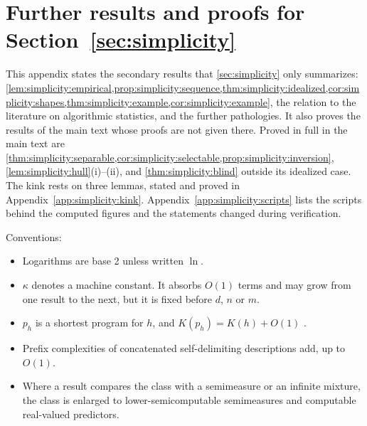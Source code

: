 \providecommand{\Risk}{\mathcal R}
\providecommand{\hRisk}{\hat{\mathcal R}}
\providecommand{\hullm}{\mathrm{hull}^{-}}
\providecommand{\Admiss}{\mathfrak A}
\providecommand{\val}{\mathrm{val}}
\providecommand{\Ax}{\mathrm{Ax}}
\providecommand{\KL}{\mathrm{KL}}
\providecommand{\Unif}{\mathrm{Unif}}
\providecommand{\conv}{\mathrm{conv}}
\providecommand{\Muniv}{\mathbf M}
\providecommand{\muniv}{\mathbf m}

\section{Further results and proofs for Section~\ref{sec:simplicity}}\label{app:simplicity}

This appendix states the secondary results that \cref{sec:simplicity} only summarizes: \cref{lem:simplicity:empirical,prop:simplicity:sequence,thm:simplicity:idealized,cor:simplicity:shapes,thm:simplicity:example,cor:simplicity:example}, the relation to the literature on algorithmic statistics, and the further pathologies. It also proves the results of the main text whose proofs are not given there. Proved in full in the main text are \cref{thm:simplicity:separable,cor:simplicity:selectable,prop:simplicity:inversion}, \cref{lem:simplicity:hull}(i)--(ii), and \cref{thm:simplicity:blind} outside its idealized case. The kink rests on three lemmas, stated and proved in Appendix~\ref{app:simplicity:kink}. Appendix~\ref{app:simplicity:scripts} lists the scripts behind the \textsf{computed} figures and the statements changed during verification.

Conventions:
\begin{itemize}
\item Logarithms are base 2 unless written $\ln$.
\item $\kappa$ denotes a machine constant. It absorbs $O(1)$ terms and may grow from one result to the next, but it is fixed before $d$, $n$ or $m$.
\item $p_h$ is a shortest program for $h$, and $K(p_h)=K(h)+O(1)$ \citep{li2008introduction}.
\item Prefix complexities of concatenated self-delimiting descriptions add, up to $O(1)$.
\item Where a result compares the class with a semimeasure or an infinite mixture, the class is enlarged to lower-semicomputable semimeasures and computable real-valued predictors.
\end{itemize}

